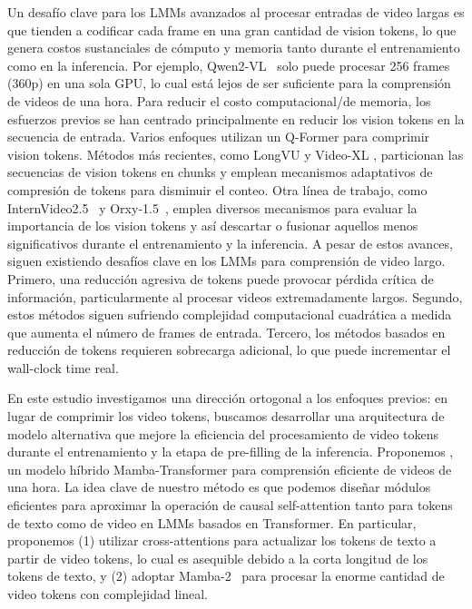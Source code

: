 Un desafío clave para los LMMs avanzados al procesar entradas de video largas es que tienden a codificar cada frame en una gran cantidad de vision tokens, lo que genera costos sustanciales de cómputo y memoria tanto durante el entrenamiento como en la inferencia. Por ejemplo, Qwen2-VL~\citep{wang2024qwen2} solo puede procesar 256 frames (360p) en una sola GPU, lo cual está lejos de ser suficiente para la comprensión de videos de una hora. Para reducir el costo computacional/de memoria, los esfuerzos previos se han centrado principalmente en reducir los vision tokens en la secuencia de entrada. Varios enfoques \cite{zhang-etal-2023-video, li2023videochat, li2024mvbench, fei2024video} utilizan un Q-Former \cite{li2023blip} para comprimir vision tokens. Métodos más recientes, como LongVU \cite{shen2024longvu} y Video-XL \cite{shu2024video}, particionan las secuencias de vision tokens en chunks y emplean mecanismos adaptativos de compresión de tokens para disminuir el conteo. Otra línea de trabajo, como InternVideo2.5~\citep{internvideo2_5} y Orxy-1.5~\citep{liu2024oryx}, emplea diversos mecanismos para evaluar la importancia de los vision tokens y así descartar o fusionar aquellos menos significativos \cite{tokenmerging} durante el entrenamiento y la inferencia. A pesar de estos avances, siguen existiendo desafíos clave en los LMMs para comprensión de video largo. Primero, una reducción agresiva de tokens puede provocar pérdida crítica de información, particularmente al procesar videos extremadamente largos. Segundo, estos métodos siguen sufriendo complejidad computacional cuadrática a medida que aumenta el número de frames de entrada. Tercero, los métodos basados en reducción de tokens requieren sobrecarga adicional, lo que puede incrementar el wall-clock time real.



En este estudio investigamos una dirección ortogonal a los enfoques previos: en lugar de comprimir los video tokens, buscamos desarrollar una arquitectura de modelo alternativa que mejore la eficiencia del procesamiento de video tokens durante el entrenamiento y la etapa de pre-filling de la inferencia. Proponemos \model, un modelo híbrido Mamba-Transformer para comprensión eficiente de videos de una hora. La idea clave de nuestro método es que podemos diseñar módulos eficientes para aproximar la operación de causal self-attention tanto para tokens de texto como de video en LMMs basados en Transformer. En particular, proponemos (1) utilizar cross-attentions para actualizar los tokens de texto a partir de video tokens, lo cual es asequible debido a la corta longitud de los tokens de texto, y (2) adoptar Mamba-2~\citep{dao2024transformers} para procesar la enorme cantidad de video tokens con complejidad lineal.


